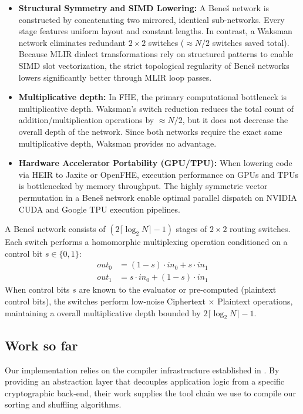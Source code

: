 \begin{itemize}
\item \textbf{Structural Symmetry and SIMD Lowering:} A Bene\v{s} network is constructed by concatenating two mirrored, identical sub-networks. Every stage features uniform layout and constant lengths. In contrast, a Waksman network eliminates redundant $2 \times 2$ switches ($\approx N/2$ switches saved total). Because MLIR dialect transformations rely on structured patterns to enable SIMD slot vectorization, the strict topological regularity of Bene\v{s} networks lowers significantly better through MLIR loop passes.
\item \textbf{Multiplicative depth:} In FHE, the primary computational bottleneck is multiplicative depth. Waksman's switch reduction reduces the total count of addition/multiplication operations by $\approx N/2$, but it does not decrease the overall depth of the network. Since both networks require the exact same multiplicative depth, Waksman provides no advantage.
\item \textbf{Hardware Accelerator Portability (GPU/TPU):} When lowering code via HEIR to Jaxite or OpenFHE, execution performance on GPUs and TPUs is bottlenecked by memory throughput. The highly symmetric vector permutation in a Bene\v{s} network enable optimal parallel dispatch on NVIDIA CUDA and Google TPU execution pipelines.
\end{itemize}

A Bene\v{s} network consists of $(2\lceil \log_2 N \rceil - 1)$ stages of $2 \times 2$ routing switches. Each switch performs a homomorphic multiplexing operation conditioned on a control bit $s \in \{0, 1\}$:\begin{align}out_0 &= (1 - s) \cdot in_0 + s \cdot in_1 \\out_1 &= s \cdot in_0 + (1 - s) \cdot in_1\end{align}When control bits $s$ are known to the evaluator or pre-computed (plaintext control bits), the switches perform low-noise Ciphertext $\times$ Plaintext operations, maintaining a overall multiplicative depth bounded by $2\lceil \log_2 N \rceil - 1$.

\subsection{Work so far}                                 %

Our implementation relies on the compiler infrastructure established in \cite{ali2025heir}. By providing an abstraction layer that decouples application logic from a specific cryptographic back-end, their work supplies the tool chain we use to compile our sorting and shuffling algorithms.

